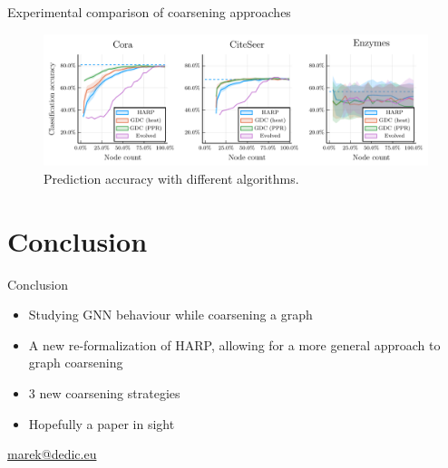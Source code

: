 \documentclass[10pt]{beamer}
\begin{document}
\begin{frame}{Experimental comparison of coarsening approaches}
	\begin{figure}
		\centering
		\includegraphics[width=\textwidth]{images/coarsening-algorithms/coarsening-algorithms.pdf}
		\caption{Prediction accuracy with different algorithms.}
	\end{figure}
\end{frame}

\section{Conclusion}

\begin{frame}{Conclusion}
	\centering
	\begin{itemize}
		\item Studying GNN behaviour while coarsening a graph
		\item A new re-formalization of HARP, allowing for a more general approach to graph coarsening
		\item 3 new coarsening strategies
		\item Hopefully a paper in sight
	\end{itemize}
\end{frame}

\begin{frame}
	\titlepage
	\hfill{}\url{marek@dedic.eu}\hspace{1cm}
	\vspace{0.5cm}
\end{frame}
\end{document}

